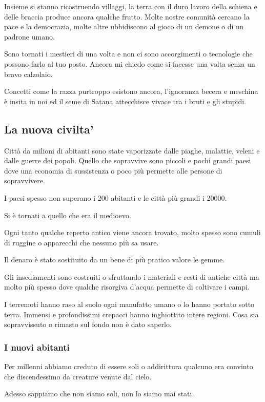 \documentclass[12pt,a4paper,twoside,openany]{book}
\begin{document}
Insieme si stanno ricostruendo villaggi, la terra con il duro lavoro della schiena e delle braccia produce ancora qualche frutto.
Molte nostre comunità cercano la pace e la democrazia, molte altre ubbidiscono al gioco di un demone o di un padrone umano.

Sono tornati i mestieri di una volta e non ci sono accorgimenti o tecnologie che possono farlo al tuo posto. Ancora mi chiedo come si facesse una volta senza un bravo calzolaio. 

Concetti come la razza purtroppo esistono ancora, l'ignoranza becera e meschina è insita in noi ed il seme di Satana attecchisce vivace tra i bruti e gli stupidi.

\subsection{La nuova civilta'}

Città da milioni di abitanti sono state vaporizzate dalle piaghe, malattie, veleni e dalle guerre dei popoli. Quello che sopravvive sono piccoli e pochi grandi paesi dove una economia di sussistenza o poco più permette alle persone di sopravvivere.

I paesi spesso non superano i 200 abitanti e le città più grandi i 20000.

Si è tornati a quello che era il medioevo.

Ogni tanto qualche reperto antico viene ancora trovato, molto spesso sono cumuli di ruggine o apparecchi che nessuno più sa usare.

Il denaro è stato sostituito da un bene di più pratico valore le gemme.

Gli insediamenti sono costruiti o sfruttando i materiali e resti di antiche città ma molto più spesso dove qualche risorgiva d'acqua permette di coltivare i campi.

I terremoti hanno raso al suolo ogni manufatto umano o lo hanno portato sotto terra. Immensi e profondissimi crepacci hanno inghiottito intere regioni. Cosa sia sopravvissuto o rimasto sul fondo non è dato saperlo.

\subsubsection{I nuovi abitanti}

Per millenni abbiamo creduto di essere soli o addirittura qualcuno era convinto che discendessimo da creature venute dal cielo.

Adesso sappiamo che non siamo soli, non lo siamo mai stati.
\end{document}
